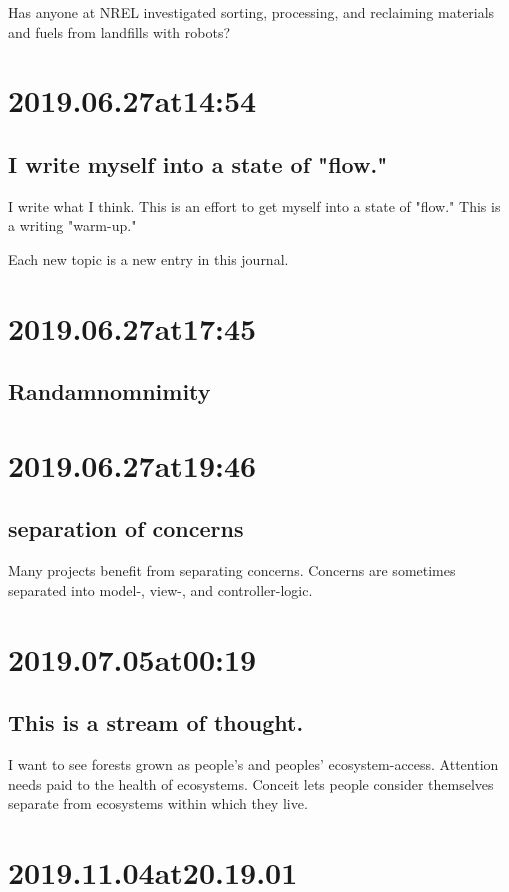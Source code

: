 Has anyone at NREL investigated sorting, processing, and reclaiming materials and fuels from landfills with robots?

\section*{ 2019.06.27at14:54 }
\subsection*{ I write myself into a state of "flow." }
I write what I think.
This is an effort to get myself into a state of "flow."
This is a writing "warm-up."

Each new topic is a new entry in this journal.

\section*{ 2019.06.27at17:45 }
\subsection*{ Randamnomnimity }

\section*{ 2019.06.27at19:46 }
\subsection*{ separation of concerns }
Many projects benefit from separating concerns.
Concerns are sometimes separated into model-, view-, and controller-logic.

\section*{ 2019.07.05at00:19 }
\subsection*{ This is a stream of thought. }
I want to see forests grown as people's and peoples' ecosystem-access.
Attention needs paid to the health of ecosystems.
Conceit lets people consider themselves separate from ecosystems within which they live.

\section*{ 2019.11.04at20.19.01 }
